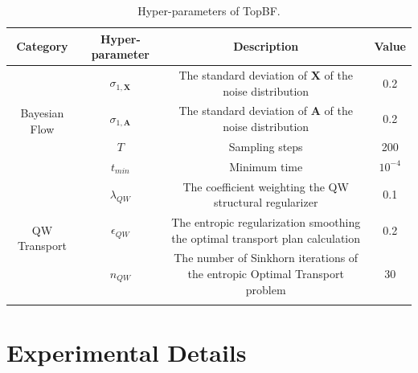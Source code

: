 

\begin{table}[t]
  \centering
  \caption{Hyper-parameters of TopBF.}
  \renewcommand \arraystretch{1.0}
  \begin{tabular*}{\textwidth}{@{\extracolsep{\fill}}cccc@{\extracolsep{\fill}}}
    \toprule
    Category & Hyper-parameter & Description & Value \\
    \midrule
    
    \multirow{4}{*}{Bayesian Flow} & $\sigma_{1, \mathbf{X}}$ & The standard deviation of $\mathbf{X}$ of the noise distribution & 0.2 \\
    & $\sigma_{1, \mathbf{A}}$ & The standard deviation of $\mathbf{A}$ of the noise distribution & 0.2 \\
    & $T$ & Sampling steps & 200 \\
    & $t_{min}$ & Minimum time & $10^{-4}$ \\

    \midrule
    \multirow{3}{*}{QW Transport} & $\lambda_{QW}$ & The coefficient weighting the QW structural regularizer & 0.1 \\
    & $\epsilon_{QW}$ & The entropic regularization smoothing the optimal transport plan calculation & 0.2 \\
    & $n_{QW}$ & The number of Sinkhorn iterations of the entropic Optimal Transport problem & 30 \\
    
    \botrule
  \end{tabular*}
  \label{tab:hp}
\end{table}

\section{Experimental Details}


